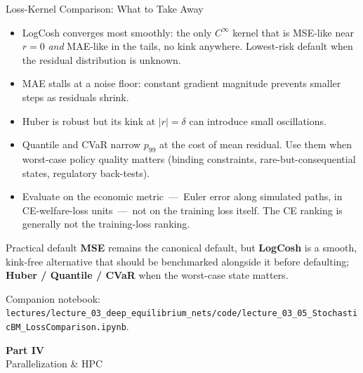 \documentclass[aspectratio=169,11pt]{beamer}
\newcommand{\emphc}[1]{\textcolor{harvardcrimson}{#1}}
\begin{document}
\begin{frame}{Loss-Kernel Comparison: What to Take Away}
\scriptsize
\begin{itemize}\itemsep1.5pt
    \item \emphc{LogCosh converges most smoothly:} the only $C^\infty$ kernel that is MSE-like near $r=0$ \emph{and} MAE-like in the tails, no kink anywhere.  Lowest-risk default when the residual distribution is unknown.
    \item \emphc{MAE stalls} at a noise floor: constant gradient magnitude prevents smaller steps as residuals shrink.
    \item \emphc{Huber is robust} but its kink at $|r|{=}\delta$ can introduce small oscillations.
    \item \emphc{Quantile and CVaR} narrow $p_{99}$ at the cost of mean residual.  Use them when worst-case policy quality matters (binding constraints, rare-but-consequential states, regulatory back-tests).
    \item \emphc{Evaluate on the economic metric}~---~Euler error along simulated paths, in CE-welfare-loss units~---~not on the training loss itself.  The CE ranking is generally not the training-loss ranking.
\end{itemize}

\vspace{0.4em}
\begin{exampleblock}{Practical default}
\textbf{MSE} remains the canonical default, but \textbf{LogCosh} is a smooth, kink-free alternative that should be benchmarked alongside it before defaulting; \textbf{Huber / Quantile / CVaR} when the worst-case state matters.
\end{exampleblock}

\vspace{0.2em}
{\scriptsize Companion notebook: \texttt{lectures/lecture\_03\_deep\_equilibrium\_nets/code/lecture\_03\_05\_StochasticBM\_LossComparison.ipynb}.}
\end{frame}


\begin{frame}{}
\vfill
\begin{center}
{\Huge \textcolor{uzhblue}{\textbf{Part IV}}}\\[12pt]
{\LARGE Parallelization \& HPC}
\end{center}
\vfill
\end{frame}
\end{document}
